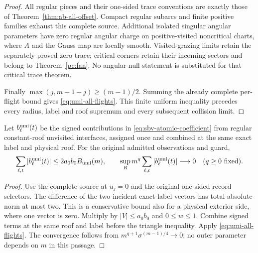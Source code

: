 \begin{proof}
All regular pieces and their one-sided trace conventions are
exactly those of Theorem~\ref{thm:ab-all-offset}. Compact regular
subarcs and finite positive families exhaust this complete
source. Additional isolated singular angular parameters have
zero regular angular charge on positive-visited noncritical
charts, where $A$ and the Gauss map are locally smooth.
Visited-grazing limits retain the separately proved zero trace;
critical corners retain their incoming sectors and belong to
Theorem~\ref{pc:fan}. No angular-null statement is substituted
for that critical trace theorem.

Finally $\max(j,m-1-j)\ge(m-1)/2$. Summing the already complete
per-flight bound gives \eqref{eq:umi-all-flights}. This finite
uniform inequality precedes every radius, label and roof
supremum and every subsequent collision limit.
\end{proof}

\begin{corollary}
\label{cor:umi-signed}
Let $b^{\rm umi}_\ell(t)$ be the signed contributions in
\eqref{eq:sbv-atomic-coefficient} from regular constant-roof
unvisited interfaces, assigned once and combined at the same
exact label and physical roof. For the original admitted
observations and guard,
\begin{equation}\label{eq:umi-signed}
 \sum_{\ell,t}|b^{\rm umi}_\ell(t)|
       \le2a_0b_0 B_{\rm umi}(m),\qquad
 \sup_R m^q\sum_{\ell,t}|b^{\rm umi}_\ell(t)|\longrightarrow0
 \quad(q\ge0\text{ fixed}).
\end{equation}
\end{corollary}
\begin{proof}
Use the complete source at $u_j=0$ and the original one-sided
record selectors. The difference of the two incident exact-label
vectors has total absolute norm at most two. This is a
conservative bound also for a physical exterior side, where
one vector is zero. Multiply by $|V|\le a_0b_0$ and
$0\le w\le1$. Combine signed terms at the same roof and label
before the triangle inequality. Apply
\eqref{eq:umi-all-flights}. The convergence follows from
$m^{q+1}\sigma^{(m-1)/4}\to0$; no outer parameter depends on
$m$ in this passage.
\end{proof}

